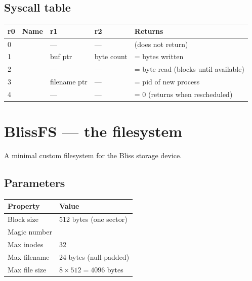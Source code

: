 \documentclass[11pt]{article}
\begin{document}
\subsection{Syscall table}
\begin{center}
\begin{tabular}{@{}C{0.9cm} L{2.2cm} L{2.6cm} L{2.6cm} L{4.0cm}@{}}
\toprule
\textbf{r0} & \textbf{Name} & \textbf{r1} & \textbf{r2} & \textbf{Returns} \\
 &   & ---     & ---        & (does not return) \\
1 &  & buf ptr & byte count &  = bytes written \\
2 &   & ---     & ---        &  = byte read (blocks until available) \\
3 &   & filename ptr & ---   &  = pid of new process \\
4 &  & ---     & ---        &  = 0 (returns when rescheduled) \\
\bottomrule
\end{tabular}
\end{center}

\section{BlissFS --- the filesystem}

A minimal custom filesystem for the Bliss storage device.

\subsection{Parameters}
\begin{center}
\begin{tabular}{@{}L{4.2cm} L{6.6cm}@{}}
\toprule
\textbf{Property} & \textbf{Value} \\
\midrule
Block size     & 512 bytes (one sector) \\
Magic number   &  \\
Max inodes     & 32 \\
Max filename   & 24 bytes (null-padded) \\
Max file size  & $8 \times 512 = 4096$ bytes \\
\bottomrule
\end{tabular}
\end{center}
\end{document}
